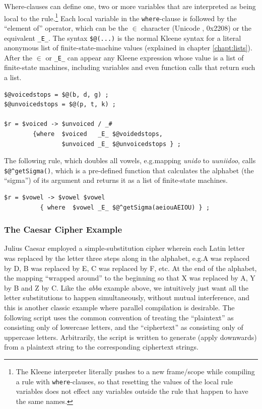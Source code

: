 Where-clauses can define one, two or more variables that are interpreted as being
local to the rule.\footnote{The Kleene interpreter literally pushes to a new
	frame/scope while compiling a rule with \texttt{where}-clauses, so that resetting the
values of the local rule variables does not effect any variables outside the rule
that happen to have the same names.}  Each local variable in the \texttt{where}-clause is
followed by the ``element of'' operator, which can be the $\in$ character
(Unicode , 0x2208) or the  equivalent \verb!_E_!.  The
syntax \verb!$@(...)! is the normal Kleene syntax for a literal anonymous list of
finite-state-machine values (explained in chapter \ref{chapt:lists}).  After the $\in$ or \verb!_E_! can appear any Kleene
expression whose value is a list of finite-state machines, including variables
and even function calls that return such a list.

\begin{samepage}
\begin{Verbatim}
$@voicedstops = $@(b, d, g) ;
$@unvoicedstops = $@(p, t, k) ;

$r = $voiced -> $unvoiced / _#  
        {where  $voiced   _E_ $@voidedstops, 
                $unvoiced _E_ $@unvoicedstops } ;
\end{Verbatim}
\end{samepage}

\noindent
The following rule, which doubles all vowels, e.g.\@ mapping \emph{unido} to
\emph{uuniidoo}, calls \verb!$@^getSigma()!, which is a pre-defined function that
calculates the alphabet (the ``sigma'') of its \fsm{}
argument and returns it as a list of finite-state machines.

\begin{Verbatim}
$r = $vowel -> $vowel $vowel 
          { where  $vowel _E_ $@^getSigma(aeiouAEIOU) } ;
\end{Verbatim}

\subsubsection{The Caesar Cipher Example}

Julius Caesar employed a simple-substitution cipher wherein each Latin
letter was replaced by the letter three steps along
in the alphabet, e.g.\@ A was replaced by D, B was replaced by E, C was replaced by F, etc.  At the end of the alphabet,
the mapping ``wrapped around'' to the beginning so that X was replaced
by A, Y by B and Z by C.  Like the \emph{abba} example
above, we intuitively just want all the letter substitutions to happen simultaneously, without mutual interference, and
this is another classic example where parallel compilation is desirable.  The following script uses the common convention
of treating the ``plaintext'' as consisting only of lowercase letters, and the ``ciphertext'' as consisting only of uppercase
letters.  Arbitrarily, the script is written to generate (apply downwards) from a plaintext string to the
corresponding ciphertext strings.


